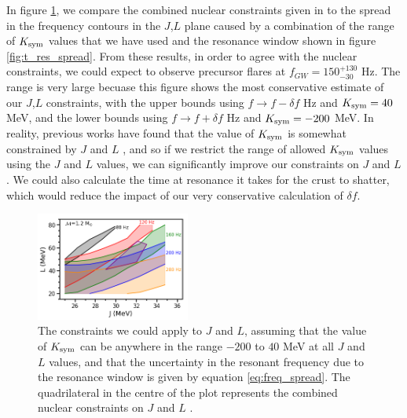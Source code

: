 \documentclass[fleqn,usenatbib]{mnras}
\begin{document}
\hspace{\parindent}In figure \ref{fig:all_constraints}, we compare the combined nuclear constraints given in \citep{lattimer2013constraining,balantekin2014nuclear} to the spread in the frequency contours in the $J$,$L$ plane caused by a combination of the range of $K_{\rm sym}$ values that we have used and the resonance window shown in figure \ref{fig:t_res_spread}. From these results, in order to agree with the nuclear constraints, we could expect to observe precursor flares at $f_{GW}=150^{+130}_{-30}$ Hz. The range is very large becuase this figure shows the most conservative estimate of our $J$,$L$ constraints, with the upper bounds using $f\rightarrow f-\delta f$ Hz and $K_{\rm sym}=40$ MeV, and the lower bounds using $f\rightarrow f+\delta f$ Hz and $K_{\rm sym}=-200$ MeV. In reality, previous works have found that the value of $K_{\rm sym}$ is somewhat constrained by $J$ and $L$ \citet{newton2020nuclear}, and so if we restrict the range of allowed $K_{\rm sym}$ values using the $J$ and $L$ values, we can significantly improve our constraints on $J$ and $L$. We could also calculate the time at resonance it takes for the crust to shatter, which would reduce the impact of our very conservative calculation of $\delta f$.


\begin{figure}
\centering
\includegraphics[width=0.45\textwidth,angle=0]{JL_spread_due_to_Ksym_and_df_grid_280}
\caption{The constraints we could apply to $J$ and $L$, assuming that the value of $K_{\rm sym}$ can be anywhere in the range $-200$ to $40$ MeV at all $J$ and $L$ values, and that the uncertainty in the resonant frequency due to the resonance window is given by equation \ref{eq:freq_spread}. The quadrilateral in the centre of the plot represents the combined nuclear constraints on $J$ and $L$ \citep{lattimer2013constraining,balantekin2014nuclear}.}%
\label{fig:all_constraints}
\end{figure}
\end{document}
